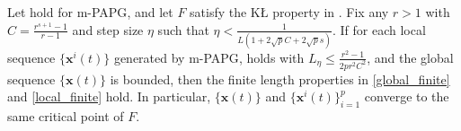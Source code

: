 \documentclass[leqno,onefignum,onetabnum]{siamart0516}
\newcommand{\xb}{\mathbf{x}}
\newcommand{\KL}{K\L\xspace}
\newcommand{\mspg}{\textsf{m-PAPG}\xspace}
\begin{document}
\begin{theorem}\label{thm:main}
	Let  hold for \mspg, and let $F$ satisfy the \KL property in . Fix any $r > 1$ with $C = \tfrac{r^{s+1}-1}{r-1}$ and step size $\eta$ such that 
	$\eta < \frac{1}{L(1+2\sqrt{p}C+2\sqrt{p}s)}$. If for each local sequence $\{\xb^i(t)\}$ generated by \mspg,  holds with $L_\eta \leq \frac{r^2-1}{2pr^2C^2}$, and the global sequence $\{\xb(t)\}$ is bounded, then the finite length properties in \eqref{global_finite} and \eqref{local_finite} hold. In particular, $\{\xb(t)\}$ and $\{\xb^i(t)\}_{i=1}^p$ converge to the same critical point of $F$.
\end{theorem}
\end{document}
